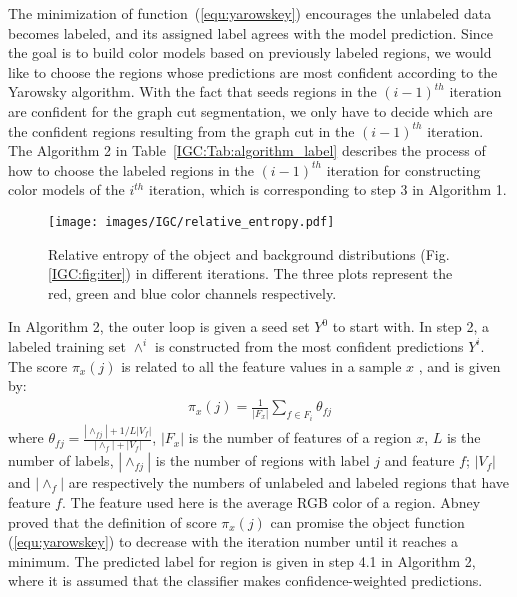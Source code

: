     The minimization of function~(\ref{equ:yarowskey}) encourages the unlabeled data becomes labeled, and its assigned label agrees with the model prediction. Since the goal is to build color models based on previously labeled regions, we would like to choose the regions whose predictions are most confident according to the Yarowsky algorithm. With the fact that seeds regions in the $(i-1)^{th}$
    iteration are confident for the graph cut segmentation, we only have to decide which are the confident regions resulting from the graph cut in the $(i-1)^{th}$ iteration. The Algorithm 2 in Table~\ref{IGC:Tab:algorithm_label} describes the process of how to choose the labeled regions in the $(i-1)^{th}$ iteration for constructing color models of the $i^{th}$ iteration, which is corresponding to step 3 in Algorithm 1.
        \begin{figure}[htp]
        \centering
        {\texttt{[image: images/IGC/relative\_entropy.pdf]}}
        \caption{Relative entropy of the object and background distributions (Fig. \ref{IGC:fig:iter}) in different iterations. The three plots represent the red, green and blue color channels respectively. }
        \label{IGC:fig:entropy}
        \end{figure}

     In Algorithm 2, the outer loop is given a seed set $Y^0$ to start with. In step 2, a labeled training set $\wedge^i$ is constructed from the most confident predictions $Y^i$. The score $\pi_x(j)$ is related to all the feature values in a sample $x$ , and is given by:
         \begin{eqnarray}
         \pi_x(j)=\frac{1}{|F_x|}\sum_{f\in F_i}\theta_{fj}
         \end{eqnarray}
         where
         $\theta_{fj}=\frac{|\wedge_{fj}|+1/L|V_f|}{|\wedge_f|+|V_f|}$,
         $|F_x|$ is the number of features of a region $x$, $L$ is the
         number of labels, $|\wedge_{fj}|$ is the number of regions with
         label $j$ and feature $f$; $|V_f|$ and $|\wedge_f|$ are respectively the
         numbers of unlabeled and labeled regions that have feature
         $f$. The feature used here is the average RGB
         color of a region. Abney \cite{Abney} proved that the definition of score $\pi_x(j)$ can promise the object function (\ref{equ:yarowskey}) to decrease with the iteration number until it reaches a minimum. The predicted label for region is given in step 4.1 in Algorithm 2, where it is assumed that the classifier makes confidence-weighted predictions.

